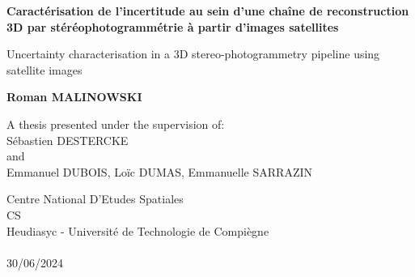 \begin{titlepage}
    \begin{center}
        \vspace*{1cm}
            
        \Huge
        \textbf{Caractérisation de l'incertitude au sein d'une chaîne de reconstruction 3D par stéréophotogrammétrie à partir d'images satellites}
            
        \vspace{0.5cm}
        \LARGE
        Uncertainty characterisation in a 3D stereo-photogrammetry pipeline using satellite images
            
        \vspace{1.5cm}
        \Large
        \textbf{Roman MALINOWSKI}
        \vspace{0.8cm}
            
        A thesis presented under the supervision of:\\
        Sébastien DESTERCKE\\
        and\\
        Emmanuel DUBOIS, Loïc DUMAS, Emmanuelle SARRAZIN
       
        \vfill
                
        \large
        Centre National D'Etudes Spatiales\\
        CS\\
        Heudiasyc - Université de Technologie de Compiègne\\
        ~\\
        30/06/2024


\end{center}
\end{titlepage}

